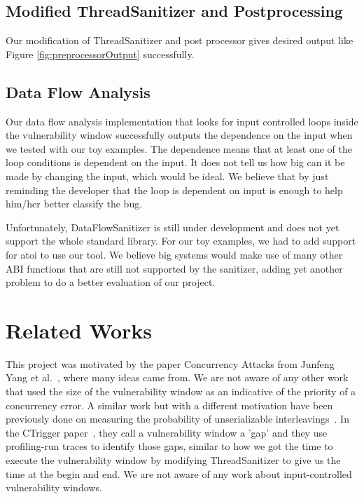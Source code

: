\documentclass{acm_proc_article-sp}
\begin{document}
\subsection{Modified ThreadSanitizer and Postprocessing}

Our modification of ThreadSanitizer and post processor gives desired output like Figure \ref{fig:preprocessorOutput} successfully. 

\subsection{Data Flow Analysis}

Our data flow analysis implementation that looks for input controlled loops inside the vulnerability window successfully outputs the dependence on the input when we tested with our toy examples. The dependence means that at least one of the loop conditions is dependent on the input. It does not tell us how big can it be made by changing the input, which would be ideal. We believe that by just reminding the developer that the loop is dependent on input is enough to help him/her better classify the bug.

Unfortunately, DataFlowSanitizer is still under development and does not yet support the whole standard library. For our toy examples, we had to add support for atoi to use our tool. We believe big systems would make use of many other ABI functions that are still not supported by the sanitizer, adding yet another problem to do a better evaluation of our project.


\section{Related Works}

This project was motivated by the paper Concurrency Attacks from Junfeng Yang et al.~\cite{yang2012concurrency}, where many ideas came from. We are not aware of any other work that used the size of the vulnerability window as an indicative of the priority of a concurrency error. A similar work but with a different motivation have been previously done on measuring the probability of unserializable interleavings~\cite{park2009ctrigger}. In the CTrigger paper~\cite{park2009ctrigger}, they call a vulnerability window a 'gap' and they use profiling-run traces to identify those gaps, similar to how we got the time to execute the vulnerability window by modifying ThreadSanitizer to give us the time at the begin and end. We are not aware of any work about input-controlled vulnerability windows.
\end{document}
